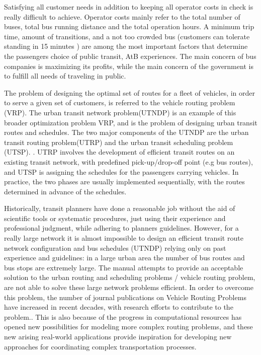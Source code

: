 Satisfying all customer needs in addition to keeping all operator costs in check is really difficult to achieve. Operator costs mainly refer to the total number of buses, total bus running distance and the total operation hours. A minimum trip time, amount of transitions, and a not too crowded bus (customers can tolerate standing in 15 minutes ) are among the most important factors that determine the passengers choice of public transit, AtB experiences. The main concern of bus companies is maximizing its profits, while the main concern of the government is to fulfill all needs of traveling in public.

The problem of designing the optimal set of routes for a fleet of vehicles, in order to serve a given set of customers, is referred to the vehicle routing problem (VRP). The urban transit network problem(UTNDP) is an example of this broader optimization problem VRP, and is the problem of designing urban transit routes and schedules. The two major components of the UTNDP are the urban transit routing problem(UTRP) and the urban transit scheduling problem (UTSP). \citep{fan09}. UTRP involves the development of efficient transit routes on an existing transit network, with predefined pick-up/drop-off point (e.g bus routes), and UTSP is assigning the schedules for the passengers carrying vehicles. In practice, the two phases are usually implemented sequentially, with the routes determined in advance of the schedules. 

Historically, transit planners have done a reasonable job without the aid of scientific tools or systematic procedures, just using their experience and professional judgment, while adhering to planners guidelines. However, for a really large network it is almost impossible to design an efficient transit route network configuration and bus schedules (UTNDP) relying only on past experience and guidelines: in a large urban area the number of bus routes and bus stops are extremely large. The manual attempts to provide an acceptable solution to the urban routing and scheduling problems / vehicle routing problem, are not able to solve these large network problems efficient. In order to overcome this problem,  the number of journal publications on Vehicle Routing Problems have increased in recent decades, with research efforts to contribute to the problem.. This is also because of the progress in computational resources has opened new possibilities for modeling more complex routing problems, and these new arising real-world applications provide inspiration for developing new approaches for coordinating complex transportation processes.
\citep{vehiclerouting}







